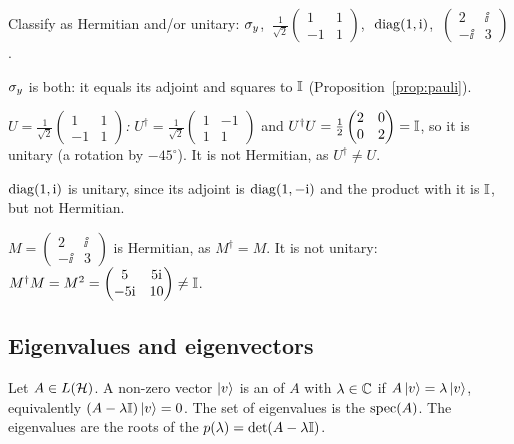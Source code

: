 \begin{example}\label{ex:classify}
  Classify as Hermitian and/or unitary: $\sigma_y$, $\ \tfrac1{\sqrt2}\begin{pmatrix}1&1\\-1&1\end{pmatrix}$, $\ \operatorname{diag}(1,\mathrm{i})$, $\ \begin{pmatrix}2&\ii\\-\ii&3\end{pmatrix}$.
\end{example}
\begin{solution}
  \begin{steps}
    \item \emph{$\sigma_y$} is both: it equals its adjoint and squares to $\mathbb{I}$ (Proposition~\ref{prop:pauli}).
    \item \emph{$U=\tfrac1{\sqrt2}\begin{pmatrix}1&1\\-1&1\end{pmatrix}$:} $U^\dagger=\tfrac1{\sqrt2}\begin{pmatrix}1&-1\\1&1\end{pmatrix}$ and $U^\dagger U=\tfrac12\begin{pmatrix}2&0\\0&2\end{pmatrix}=\mathbb{I}$, so it is unitary (a rotation by $-45^\circ$). It is not Hermitian, as $U^\dagger\neq U$.
    \item \emph{$\operatorname{diag}(1,\mathrm{i})$} is unitary, since its adjoint is $\operatorname{diag}(1,-\mathrm{i})$ and the product with it is $\mathbb{I}$, but not Hermitian.
    \item \emph{$M=\begin{pmatrix}2&\ii\\-\ii&3\end{pmatrix}$} is Hermitian, as $M^\dagger=M$. It is not unitary: $M^\dagger M=M^2=\begin{pmatrix}5&5\mathrm{i}\\-5\mathrm{i}&10\end{pmatrix}\neq\mathbb{I}$.
  \end{steps}
\end{solution}

\subsection{Eigenvalues and eigenvectors}

\begin{definition}\label{def:eigen}
  Let $A\in L(\mathcal{H})$. A non-zero vector $\left|v\right\rangle$ is an  of $A$ with  $\lambda\in\mathbb{C}$ if $A\left|v\right\rangle=\lambda\left|v\right\rangle$, equivalently $(A-\lambda\mathbb{I})\left|v\right\rangle=0$. The set of eigenvalues is the  $\operatorname{spec}(A)$. The eigenvalues are the roots of the  $p(\lambda)=\det(A-\lambda\mathbb{I})$.
\end{definition}

